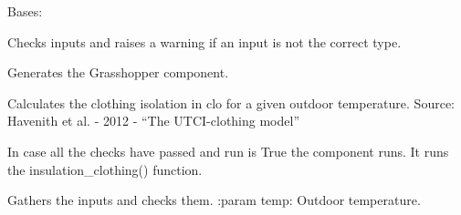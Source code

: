 \documentclass[letterpaper,10pt,english]{sphinxmanual}
\begin{document}
\begin{fulllineitems}
\label{\detokenize{comfort:livestock.components.comfort.AdaptiveClothing}}
Bases: {\hyperref[\detokenize{superclass:livestock.components.component.GHComponent}]{}}

\begin{fulllineitems}
\label{\detokenize{comfort:livestock.components.comfort.AdaptiveClothing.check_inputs}}
Checks inputs and raises a warning if an input is not the correct type.

\end{fulllineitems}


\begin{fulllineitems}
\label{\detokenize{comfort:livestock.components.comfort.AdaptiveClothing.config}}
Generates the Grasshopper component.

\end{fulllineitems}


\begin{fulllineitems}
\label{\detokenize{comfort:livestock.components.comfort.AdaptiveClothing.insulation_clothing}}
Calculates the clothing isolation in clo for a given outdoor temperature.
Source: Havenith et al. - 2012 - “The UTCI-clothing model”

\end{fulllineitems}


\begin{fulllineitems}
\label{\detokenize{comfort:livestock.components.comfort.AdaptiveClothing.run}}
In case all the checks have passed and run is True the component runs.
It runs the insulation\_clothing() function.

\end{fulllineitems}


\begin{fulllineitems}
\label{\detokenize{comfort:livestock.components.comfort.AdaptiveClothing.run_checks}}
Gathers the inputs and checks them.
:param temp: Outdoor temperature.

\end{fulllineitems}


\end{fulllineitems}
\end{document}
